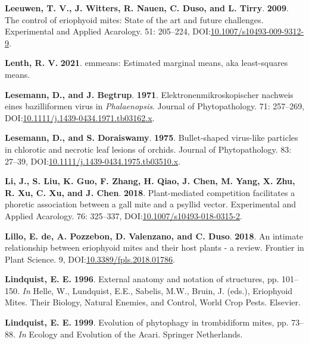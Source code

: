 \documentclass[12pt,final,CPage]{ufthesis}
\newlength{\cslhangindent}
\newenvironment{CSLReferences}[2] %
{%
	\setlength{\parindent}{0pt}
	\ifodd #1 \everypar{\setlength{\hangindent}{\cslhangindent}}\ignorespaces\fi
	\ifnum #2 > 0
	\setlength{\parskip}{#2\baselineskip}
	\fi
}%
{}
\begin{document}
{\begin{CSLReferences}{1}{0}
  \leavevmode{}%
  \textbf{Leeuwen, T. V., J. Witters, R. Nauen, C. Duso, and L. Tirry}. \textbf{2009}. The control of eriophyoid mites: State of the art and future challenges. Experimental and Applied Acarology. 51: 205--224, DOI:\href{https://doi.org/10.1007/s10493-009-9312-9}{10.1007/s10493-009-9312-9}.

  \leavevmode{}%
  \textbf{Lenth, R. V.} \textbf{2021}. {emmeans}: Estimated marginal means, aka least-squares means.

  \leavevmode{}%
  \textbf{Lesemann, D., and J. Begtrup}. \textbf{1971}. Elektronenmikroskopischer nachweis eines bazilliformen virus in {\emph{Phalaenopsis}}. Journal of Phytopathology. 71: 257--269, DOI:\href{https://doi.org/10.1111/j.1439-0434.1971.tb03162.x}{10.1111/j.1439-0434.1971.tb03162.x}.

  \leavevmode{}%
  \textbf{Lesemann, D., and S. Doraiswamy}. \textbf{1975}. Bullet-shaped virus-like particles in chlorotic and necrotic leaf lesions of orchids. Journal of Phytopathology. 83: 27--39, DOI:\href{https://doi.org/10.1111/j.1439-0434.1975.tb03510.x}{10.1111/j.1439-0434.1975.tb03510.x}.

  \leavevmode{}%
  \textbf{Li, J., S. Liu, K. Guo, F. Zhang, H. Qiao, J. Chen, M. Yang, X. Zhu, R. Xu, C. Xu, and J. Chen}. \textbf{2018}. Plant-mediated competition facilitates a phoretic association between a gall mite and a psyllid vector. Experimental and Applied Acarology. 76: 325--337, DOI:\href{https://doi.org/10.1007/s10493-018-0315-2}{10.1007/s10493-018-0315-2}.

  \leavevmode{}%
  \textbf{Lillo, E. de, A. Pozzebon, D. Valenzano, and C. Duso}. \textbf{2018}. An intimate relationship between eriophyoid mites and their host plants - a review. Frontier in Plant Science. 9, DOI:\href{https://doi.org/10.3389/fpls.2018.01786}{10.3389/fpls.2018.01786}.

  \leavevmode{}%
  \textbf{Lindquist, E. E.} \textbf{1996}. External anatomy and notation of structures, pp. 101--150. \emph{In} Helle, W., Lundquist, E.E., Sabelis, M.W., Bruin, J. (eds.), Eriophyoid Mites. Their Biology, Natural Enemies, and Control, World Crop Pests. Elsevier.

  \leavevmode{}%
  \textbf{Lindquist, E. E.} \textbf{1999}. Evolution of phytophagy in trombidiform mites, pp. 73--88. \emph{In} Ecology and Evolution of the Acari. Springer Netherlands.


\end{CSLReferences}}
\end{document}
